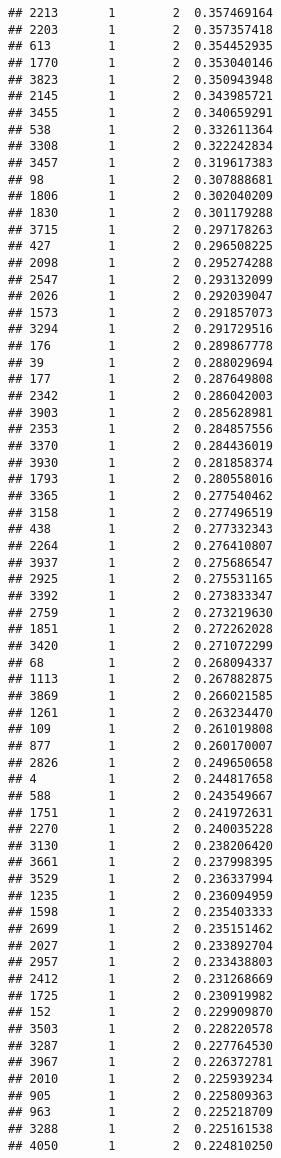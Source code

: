 \documentclass[
]{article}
\begin{document}
\begin{verbatim}
## 2213       1        2  0.357469164
## 2203       1        2  0.357357418
## 613        1        2  0.354452935
## 1770       1        2  0.353040146
## 3823       1        2  0.350943948
## 2145       1        2  0.343985721
## 3455       1        2  0.340659291
## 538        1        2  0.332611364
## 3308       1        2  0.322242834
## 3457       1        2  0.319617383
## 98         1        2  0.307888681
## 1806       1        2  0.302040209
## 1830       1        2  0.301179288
## 3715       1        2  0.297178263
## 427        1        2  0.296508225
## 2098       1        2  0.295274288
## 2547       1        2  0.293132099
## 2026       1        2  0.292039047
## 1573       1        2  0.291857073
## 3294       1        2  0.291729516
## 176        1        2  0.289867778
## 39         1        2  0.288029694
## 177        1        2  0.287649808
## 2342       1        2  0.286042003
## 3903       1        2  0.285628981
## 2353       1        2  0.284857556
## 3370       1        2  0.284436019
## 3930       1        2  0.281858374
## 1793       1        2  0.280558016
## 3365       1        2  0.277540462
## 3158       1        2  0.277496519
## 438        1        2  0.277332343
## 2264       1        2  0.276410807
## 3937       1        2  0.275686547
## 2925       1        2  0.275531165
## 3392       1        2  0.273833347
## 2759       1        2  0.273219630
## 1851       1        2  0.272262028
## 3420       1        2  0.271072299
## 68         1        2  0.268094337
## 1113       1        2  0.267882875
## 3869       1        2  0.266021585
## 1261       1        2  0.263234470
## 109        1        2  0.261019808
## 877        1        2  0.260170007
## 2826       1        2  0.249650658
## 4          1        2  0.244817658
## 588        1        2  0.243549667
## 1751       1        2  0.241972631
## 2270       1        2  0.240035228
## 3130       1        2  0.238206420
## 3661       1        2  0.237998395
## 3529       1        2  0.236337994
## 1235       1        2  0.236094959
## 1598       1        2  0.235403333
## 2699       1        2  0.235151462
## 2027       1        2  0.233892704
## 2957       1        2  0.233438803
## 2412       1        2  0.231268669
## 1725       1        2  0.230919982
## 152        1        2  0.229909870
## 3503       1        2  0.228220578
## 3287       1        2  0.227764530
## 3967       1        2  0.226372781
## 2010       1        2  0.225939234
## 905        1        2  0.225809363
## 963        1        2  0.225218709
## 3288       1        2  0.225161538
## 4050       1        2  0.224810250

\end{verbatim}
\end{document}
